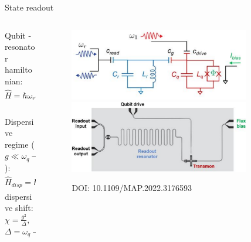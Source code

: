 \documentclass[aspectratio=169,10pt]{beamer}
\begin{document}
\begin{frame}[t,fragile]{State readout}
  \begin{columns}
    \begin{column}{0.35\textwidth}
    Qubit - resonator hamiltonian:
    \begin{equation*}
      \hat{H} = \hbar\omega_r\hat{a}\hat{a}^\dagger - \frac{\hbar\omega_{01}}{2}\hat{\sigma}_z + \hbar g(\hat{\sigma}^+\hat{a}+\hat{\sigma}^-\hat{a}^\dagger)
    \end{equation*}\\
    \vspace{1.5em}
    Dispersive regime ($g \ll \omega_q - \omega_r$):
    \begin{equation*}
      \hat{H}_{disp} = \hbar(\omega_r - \chi\hat{\sigma}_z)\hat{a}^\dagger\hat{a} - \frac{\hbar}{2}(\omega_{01}+\chi)\hat{\sigma}_z
    \end{equation*}
    dispersive shift: $\chi = \frac{g^2}{\Delta},$ \hfill $\Delta = \omega_q - \omega_r$
  \end{column}
    \begin{column}{0.65\textwidth}
      \begin{center}
        \begin{figure}
          \vspace{2mm}
          \includegraphics[width=0.85\textwidth]{figures/TransmonCircuit.png}
          \vfill
          \includegraphics[width=0.85\textwidth]{figures/TransmonBoard.png}
          \caption{DOI: 10.1109/MAP.2022.3176593}
        \end{figure}
      \end{center}
    \end{column}
  \end{columns}
\end{frame}
\end{document}

